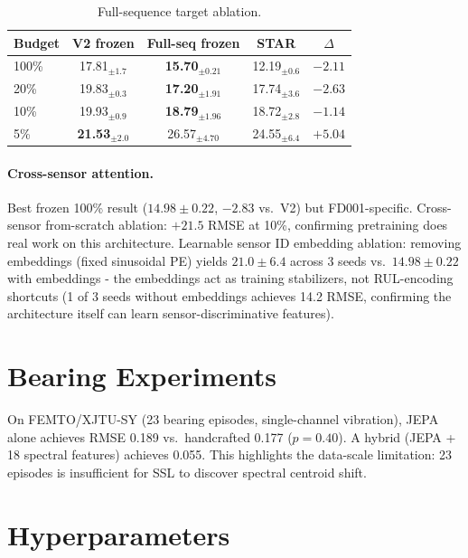 \documentclass{article}
\begin{document}
\begin{table}[h]
\centering
\caption{Full-sequence target ablation.}
\label{tab:full_sequence}
\small
\begin{tabular}{@{}lcccc@{}}
\toprule
Budget & V2 frozen & Full-seq frozen & STAR & $\Delta$ \\
\midrule
100\% & 17.81$_{\pm1.7}$ & \textbf{15.70}$_{\pm0.21}$ & 12.19$_{\pm0.6}$ & $-2.11$ \\
20\%  & 19.83$_{\pm0.3}$ & \textbf{17.20}$_{\pm1.91}$ & 17.74$_{\pm3.6}$ & $-2.63$ \\
10\%  & 19.93$_{\pm0.9}$ & \textbf{18.79}$_{\pm1.96}$ & 18.72$_{\pm2.8}$ & $-1.14$ \\
5\%   & \textbf{21.53}$_{\pm2.0}$ & 26.57$_{\pm4.70}$ & 24.55$_{\pm6.4}$ & $+5.04$ \\
\bottomrule
\end{tabular}
\end{table}

\paragraph{Cross-sensor attention.} Best frozen 100\% result ($14.98 \pm 0.22$, $-2.83$ vs.\ V2) but FD001-specific. Cross-sensor from-scratch ablation: $+21.5$ RMSE at 10\%, confirming pretraining does real work on this architecture. Learnable sensor ID embedding ablation: removing embeddings (fixed sinusoidal PE) yields $21.0 \pm 6.4$ across 3 seeds vs.\ $14.98 \pm 0.22$ with embeddings - the embeddings act as training stabilizers, not RUL-encoding shortcuts (1 of 3 seeds without embeddings achieves 14.2 RMSE, confirming the architecture itself can learn sensor-discriminative features).

\section{Bearing Experiments}
\label{app:bearings}

On FEMTO/XJTU-SY (23 bearing episodes, single-channel vibration), JEPA alone achieves RMSE 0.189 vs.\ handcrafted 0.177 ($p = 0.40$). A hybrid (JEPA + 18 spectral features) achieves 0.055. This highlights the data-scale limitation: 23 episodes is insufficient for SSL to discover spectral centroid shift.

\section{Hyperparameters}
\label{app:hyperparams}
\end{document}
